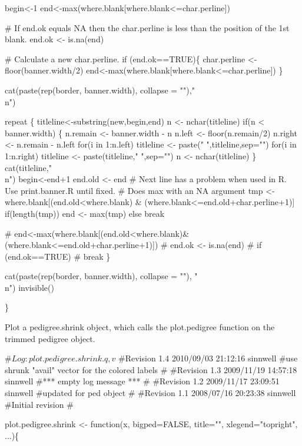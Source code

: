 \documentclass{article}
\begin{document}
\begin{enumerate}
  begin<-1
  end<-max(where.blank[where.blank<=char.perline])

# If end.ok equals NA then the char.perline is less than the position of the 1st blank.
  end.ok <- is.na(end) 

# Calculate a new char.perline. 
  if (end.ok==TRUE)\{ 
    char.perline <- floor(banner.width/2)
    end<-max(where.blank[where.blank<=char.perline])
  \}

  cat(paste(rep(border, banner.width), collapse = ""),"\\n")

  repeat \{
    titleline<-substring(new,begin,end)
    n <- nchar(titleline)
    if(n < banner.width)
      \{
        n.remain <- banner.width - n
        n.left <- floor(n.remain/2)
        n.right <- n.remain - n.left
        for(i in 1:n.left) titleline <- paste(" ",titleline,sep="")
        for(i in 1:n.right) titleline <- paste(titleline," ",sep="")
        n <- nchar(titleline)
      \}
     cat(titleline,"\\n")
    begin<-end+1
    end.old <- end
   # Next line has a problem when used in R.  Use print.banner.R until fixed.
   # Does max with an NA argument
    tmp <- where.blank[(end.old<where.blank) & (where.blank<=end.old+char.perline+1)]
    if(length(tmp)) end <- max(tmp)
    else break
   
#   end<-max(where.blank[(end.old<where.blank)&(where.blank<=end.old+char.perline+1)])
#   end.ok <- is.na(end)
#   if (end.ok==TRUE)
#      break
  \}
  
  cat(paste(rep(border, banner.width), collapse = ""), "\\n")
  invisible()
  
\}

\nwendcode{}\nwdocspar


Plot a pedigree.shrink object, which calls the plot.pedigree function on the trimmed 
pedigree object.

\nwenddocs{}\endmoddef
#$Log: plot.pedigree.shrink.q,v $
#Revision 1.4  2010/09/03 21:12:16  sinnwell
#use shrunk "avail" vector for the colored labels
#
#Revision 1.3  2009/11/19 14:57:18  sinnwell
#*** empty log message ***
#
#Revision 1.2  2009/11/17 23:09:51  sinnwell
#updated for ped object
#
#Revision 1.1  2008/07/16 20:23:38  sinnwell
#Initial revision
#

plot.pedigree.shrink <- function(x, bigped=FALSE, title="", 
                                 xlegend="topright", ...)\{


\end{enumerate}
\end{document}
